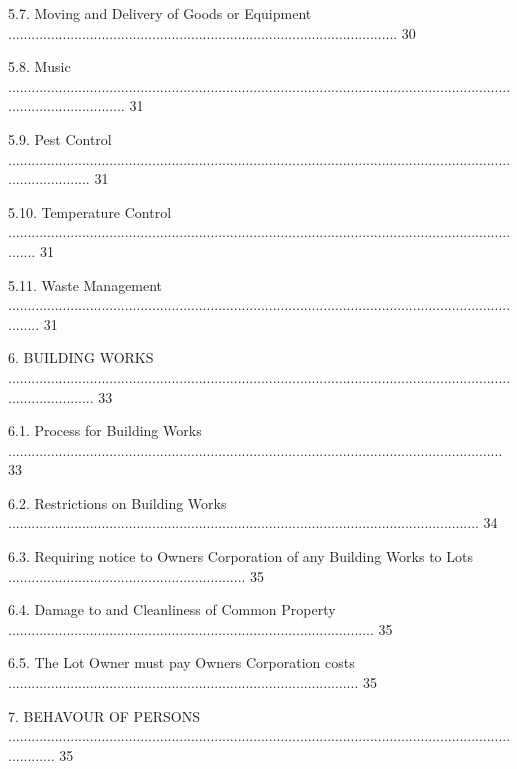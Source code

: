 \documentclass{article}
\begin{document}
{\fontsize{9.99}{1}5.7. Moving and Delivery of Goods or Equipment .................................................................................................... 30 }

{\fontsize{9.99}{1}5.8. Music ............................................................................................................................................................... 31 }

{\fontsize{9.99}{1}5.9. Pest Control ...................................................................................................................................................... 31 }

{\fontsize{9.99}{1}5.10. Temperature Control ........................................................................................................................................ 31 }

{\fontsize{9.99}{1}5.11. Waste Management ......................................................................................................................................... 31 }

{\fontsize{9.99}{1}6. BUILDING WORKS ....................................................................................................................................................... 33 }

{\fontsize{9.99}{1}6.1. Process for Building Works ............................................................................................................................... 33 }

{\fontsize{9.99}{1}6.2. Restrictions on Building Works ......................................................................................................................... 34 }

{\fontsize{9.99}{1}6.3. Requiring notice to Owners Corporation of any Building Works to Lots ............................................................. 35 }

{\fontsize{9.99}{1}6.4. Damage to and Cleanliness of Common Property .............................................................................................. 35 }

{\fontsize{9.99}{1}6.5. The Lot Owner must pay Owners Corporation costs .......................................................................................... 35 }

{\fontsize{9.99}{1}7. BEHAVOUR OF PERSONS ............................................................................................................................................. 35 }
\end{document}
